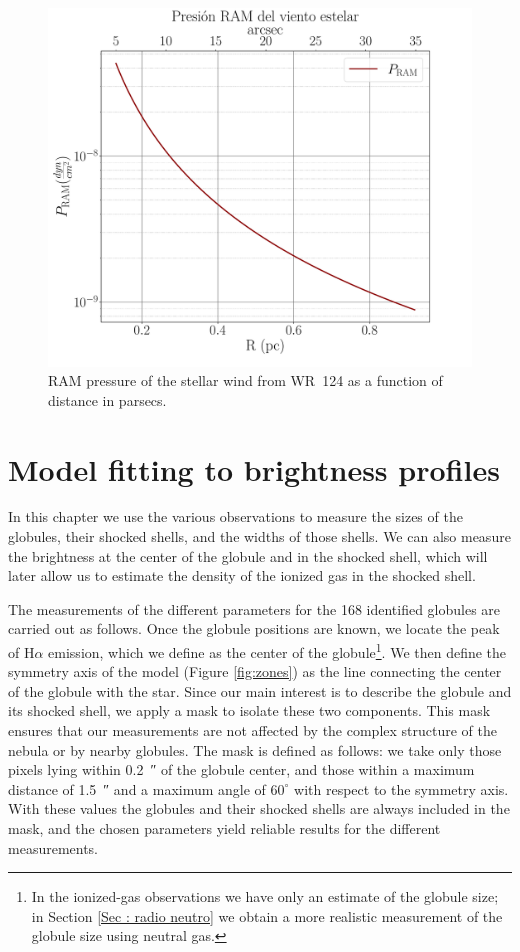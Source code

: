 \documentclass{book}
\begin{document}
\begin{figure}[htb]
  \centering    \includegraphics[width=\textwidth]{Nuevas imagenes finales/PRAMcgs_n.pdf}
  \caption{RAM pressure of the stellar wind from WR~124 as a function
    of distance in parsecs.}
  \label{P_RAM}
\end{figure}


  
\chapter{Model fitting to brightness profiles}
\label{Chapter : Ajuste}

In this chapter we use the various observations to measure the sizes
of the globules, their shocked shells, and the widths of those shells.
We can also measure the brightness at the center of the globule and in
the shocked shell, which will later allow us to estimate the density
of the ionized gas in the shocked shell.

The measurements of the different parameters for the 168 identified
globules are carried out as follows. Once the globule positions are
known, we locate the peak of H$\alpha$ emission, which we define as the
center of the globule\footnote{In the ionized-gas observations we have
only an estimate of the globule size; in Section \ref{Sec : radio
  neutro} we obtain a more realistic measurement of the globule size
using neutral gas.}. We then define the symmetry axis of the model
(Figure \ref{fig:zones}) as the line connecting the center of the
globule with the star. Since our main interest is to describe the
globule and its shocked shell, we apply a mask to isolate these two
components. This mask ensures that our measurements are not affected
by the complex structure of the nebula or by nearby globules. The mask
is defined as follows: we take only those pixels lying within
\SI{0.2}{\arcsecond} of the globule center, and those within a maximum
distance of \SI{1.5}{\arcsecond} and a maximum angle of $60^\circ$
with respect to the symmetry axis. With these values the globules and
their shocked shells are always included in the mask, and the chosen
parameters yield reliable results for the different measurements.
\end{document}
